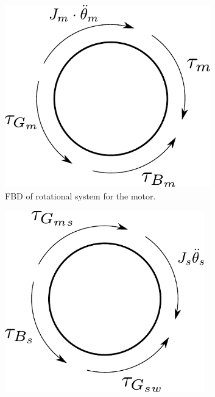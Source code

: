 \begin{figure}[H]
\centering
\begin{subfigure}[b]{0.3\textwidth}		
        \includegraphics[width=0.98\textwidth]{figures/FBD/FBDMotor.pdf}
        \vspace{3.5mm}
        \caption{FBD of rotational system for the motor.}
        \label{fig:FBDMotor}
    \end{subfigure} 
    \hspace{4mm} 
\begin{subfigure}[b]{0.3\textwidth}
        \includegraphics[width=0.95\textwidth]{figures/FBD/FBDShaft.pdf}

\end{subfigure}
\end{figure}
